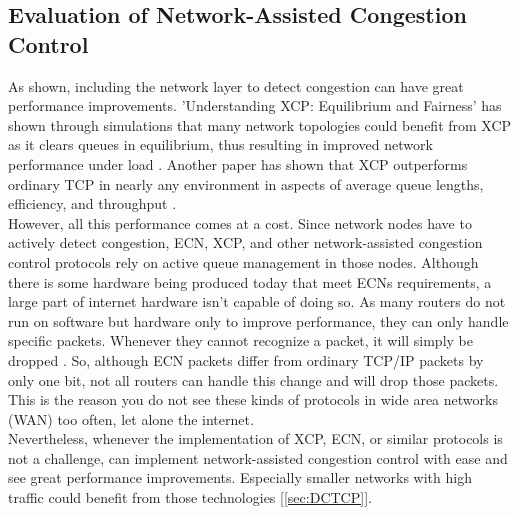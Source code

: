 \documentclass[a4paper,conference]{IEEEtran}
\begin{document}
\subsection{Evaluation of Network-Assisted Congestion Control}
As shown, including the network layer to detect congestion can have great performance improvements. 'Understanding XCP: Equilibrium and Fairness' has shown through simulations that many network topologies could benefit from XCP as it clears queues in equilibrium, thus resulting in improved network performance under load \cite{1498331}. Another paper has shown that XCP outperforms ordinary TCP in nearly any environment in aspects of average queue lengths, efficiency, and throughput \cite{katabi2002congestion}.
\\However, all this performance comes at a cost. Since network nodes have to actively detect congestion, ECN, XCP, and other network-assisted congestion control protocols rely on active queue management in those nodes. Although there is some hardware being produced today that meet ECNs requirements, a large part of internet hardware isn't capable of doing so. As many routers do not run on software but hardware only to improve performance, they can only handle specific packets. Whenever they cannot recognize a packet, it will simply be dropped \cite{katabi2002congestion}. So, although ECN packets differ from ordinary TCP/IP packets by only one bit, not all routers can handle this change and will drop those packets. This is the reason you do not see these kinds of protocols in wide area networks (WAN) too often, let alone the internet.
\\Nevertheless, whenever the implementation of XCP, ECN, or similar protocols is not a challenge, can implement network-assisted congestion control with ease and see great performance improvements. Especially smaller networks with high traffic could benefit from those technologies [\autoref{sec:DCTCP}].
\end{document}
